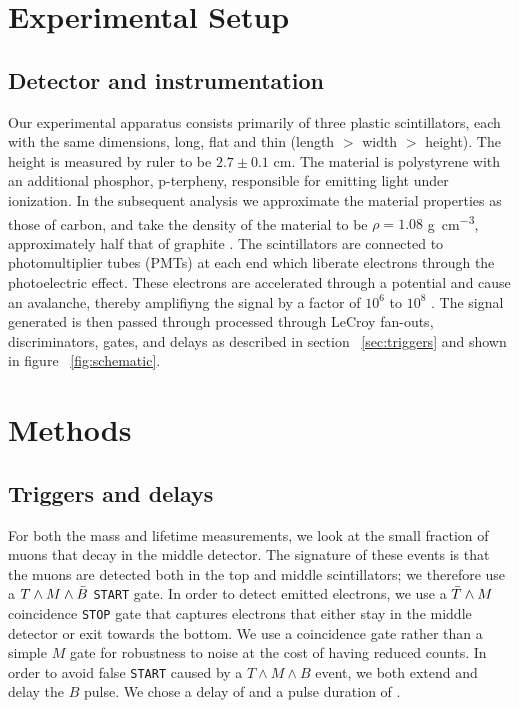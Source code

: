 \documentclass[aps,prb,twocolumn,superscriptaddress,floatfix,longbibliography,citeautoscript]{revtex4-2}
\begin{document}


\section{\label{sec:setup}Experimental Setup}
\subsection{Detector and instrumentation}
Our experimental apparatus consists primarily of three plastic scintillators, each with the same dimensions, long, flat and thin (length $>$ width $>$ height). The height is measured by ruler to be $2.7 \pm 0.1$ \si{\cm}. The material is polystyrene with an additional phosphor, p-terpheny, responsible for emitting light under ionization. In the subsequent analysis we approximate the material properties as those of carbon, and take the density of the material to be $\rho = 1.08 $ \si{\gram\per\cm\cubed}, approximately half that of graphite \cite{MuonLifetimeWiki}.  The scintillators are connected to photomultiplier tubes (PMTs) at each end which liberate electrons through the photoelectric effect. These electrons are accelerated through a potential and cause an avalanche, thereby amplifiyng the signal by a factor of $10^6$ to $10^8$ \cite{MuonLifetimeWiki}. The signal generated is then passed through processed through LeCroy  fan-outs, discriminators, gates, and delays as described in section ~\ref{sec:triggers} and shown in figure ~\ref{fig:schematic}.


\section{\label{sec:methods}Methods}


\subsection{\label{sec:triggers}Triggers and delays}

For both the mass and lifetime measurements, we look at the small fraction of muons that decay in the middle detector. The signature of these events is that the muons are detected both in the top and middle scintillators; we therefore use a $T\wedge M \wedge \Bar{B}$ \texttt{START} gate. In order to detect emitted electrons, we use a $\Bar{T}\wedge M$ coincidence \texttt{STOP} gate that captures electrons that either stay in the middle detector or exit towards the bottom. We use a coincidence gate rather than a simple $M$ gate for robustness to noise at the cost of having reduced counts.
In order to avoid false \texttt{START} caused by a $T\wedge M\wedge B$ event, we both extend and delay the $B$ pulse. We chose a delay of  and a pulse duration of .
\end{document}
